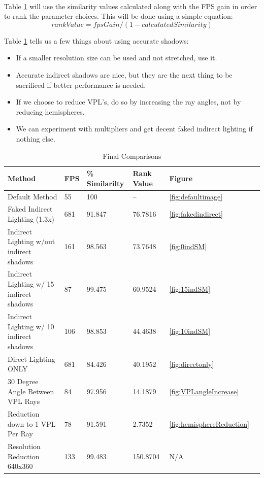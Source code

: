\paragraph{}
Table \ref{table:5.10} will use the similarity values calculated along with the FPS gain in order to rank the parameter choices.  This will be done using a simple equation:
\begin{equation}
rankValue = fpsGain / (1-calculatedSimilarity)
\end{equation}

Table \ref{table:5.10} tells us a few things about using accurate shadows:
\begin{itemize}
\item If a smaller resolution size can be used and not stretched, use it.
\item Accurate indirect shadows are nice, but they are the next thing to be sacrificed if better performance is needed.
\item If we choose to reduce VPL's, do so by increasing the ray angles, not by reducing hemispheres.
\item We can experiment with multipliers and get decent faked indirect lighting if nothing else.
\end{itemize}

\begin{table}[h!]
	\caption{Final Comparisons}
	\begin{center}
	    \begin{tabular}{ | l | l | l | l | l | l |}
	    \hline
	    Method & FPS & \% Similarilty & Rank Value & Figure\\ \hline
	    Default Method & 55 & 100 & -- & \ref{fig:defaultimage}\\ \hline
	    Faked Indirect Lighting (1.3x) & 681 & 91.847 & 76.7816 & \ref{fig:fakedindirect}\\ \hline
	    Indirect Lighting w/out indirect shadows & 161 & 98.563 & 73.7648 & \ref{fig:0indSM}\\ \hline
	    Indirect Lighting w/ 15 indirect shadows & 87 & 99.475 & 60.9524 & \ref{fig:15indSM}\\ \hline
	    Indirect Lighting w/ 10 indirect shadows & 106 & 98.853 & 44.4638 & \ref{fig:10indSM}\\ \hline
	    Direct Lighting ONLY & 681 & 84.426 & 40.1952 & \ref{fig:directonly}\\ \hline
	    30 Degree Angle Between VPL Rays & 84 & 97.956 & 14.1879 & \ref{fig:VPLangleIncrease}\\ \hline
	    Reduction down to 1 VPL Per Ray & 78 & 91.591 & 2.7352 & \ref{fig:hemisphereReduction}\\ \hline
	    Resolution Reduction 640x360 & 133 & 99.483 & 150.8704 & N/A\\ \hline
	    \end{tabular}
	\end{center}
	\label{table:5.10}
\end{table}

